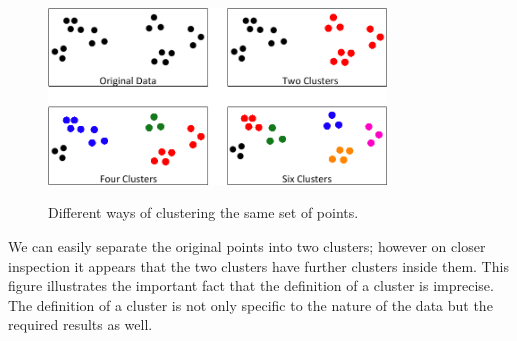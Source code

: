 \begin{figure}[H]
  \begin{center}
    \includegraphics[width=0.80\textwidth]{chapter3/clustering/ClusterDefinition1.png}
    \label{fig:clusterDefinition}
    \caption
      {Different ways of clustering the same set of points.}
  \end{center}
\end{figure}

We can easily separate the original points into two clusters; however on closer 
inspection it appears that the two clusters have further clusters inside them. 
This figure illustrates the important fact that the definition of a cluster is 
imprecise. The definition of a cluster is not only specific to the nature of the 
data but the required results as well.